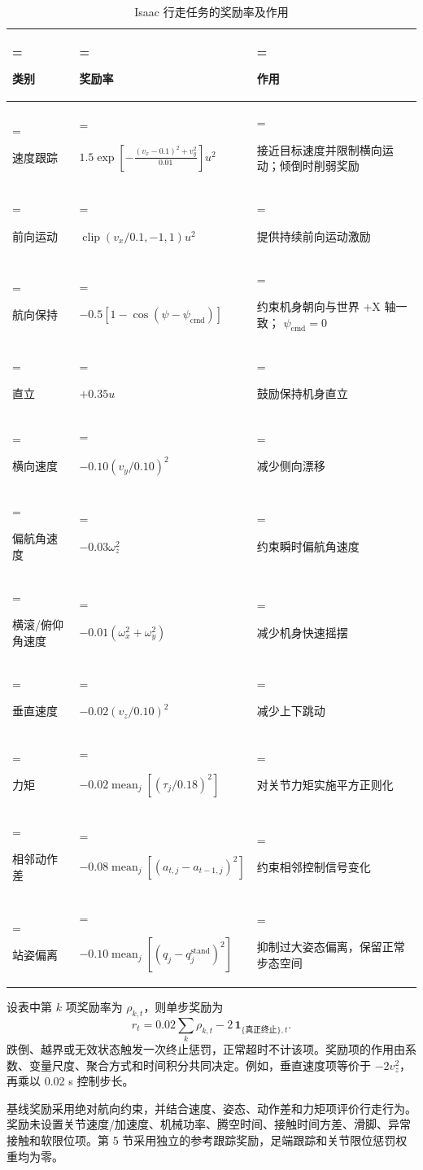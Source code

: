 \documentclass[UTF8,a4paper,zihao=5,fontset=fandol]{ctexart}
\begin{document}
\begin{table}[!htbp]
\centering
\caption{Isaac 行走任务的奖励率及作用}
\label{tab:results-3}
\begingroup
\fontsize{8.4}{11.2}\selectfont
\setlength{\tabcolsep}{3pt}
\renewcommand{\arraystretch}{1.20}
\begin{tabularx}{\linewidth}{@{}>{\hsize=0.420000\hsize\linewidth=\hsize\raggedright\arraybackslash}X>{\hsize=1.470000\hsize\linewidth=\hsize\raggedright\arraybackslash}X>{\hsize=1.110000\hsize\linewidth=\hsize\raggedright\arraybackslash}X@{}}
\toprule
\textbf{类别} & \textbf{奖励率} & \textbf{作用} \\
\midrule
速度跟踪 & \(1.5\exp\!\left[-\frac{(v_x-0.1)^2+v_y^2}{0.01}\right]u^2\) & 接近目标速度并限制横向运动；倾倒时削弱奖励 \\
前向运动 & \(\operatorname{clip}(v_x/0.1,-1,1)u^2\) & 提供持续前向运动激励 \\
航向保持 & \(-0.5[1-\cos(\psi-\psi_{\mathrm{cmd}})]\) & 约束机身朝向与世界 +X 轴一致； \(\psi_{\mathrm{cmd}}=0\) \\
直立 & \(+0.35u\) & 鼓励保持机身直立 \\
横向速度 & \(-0.10(v_y/0.10)^2\) & 减少侧向漂移 \\
偏航角速度 & \(-0.03\omega_z^2\) & 约束瞬时偏航角速度 \\
横滚/俯仰角速度 & \(-0.01(\omega_x^2+\omega_y^2)\) & 减少机身快速摇摆 \\
垂直速度 & \(-0.02(v_z/0.10)^2\) & 减少上下跳动 \\
力矩 & \(-0.02\operatorname{mean}_j[(\tau_j/0.18)^2]\) & 对关节力矩实施平方正则化 \\
相邻动作差 & \(-0.08\operatorname{mean}_j[(a_{t,j}-a_{t-1,j})^2]\) & 约束相邻控制信号变化 \\
站姿偏离 & \(-0.10\operatorname{mean}_j[(q_j-q^{\mathrm{stand}}_j)^2]\) & 抑制过大姿态偏离，保留正常步态空间 \\
\bottomrule
\end{tabularx}
\endgroup
\end{table}
\FloatBarrier

设表中第 \(k\) 项奖励率为 \(\rho_{k,t}\)，则单步奖励为
\begin{equation}
r_t=0.02\sum_k\rho_{k,t}-2\,\mathbf{1}_{\{\text{真正终止}\},t}.
\end{equation}
跌倒、越界或无效状态触发一次终止惩罚，正常超时不计该项。奖励项的作用由系数、变量尺度、聚合方式和时间积分共同决定。例如，垂直速度项等价于 \(-2v_z^2\)，再乘以 0.02 s 控制步长。

基线奖励采用绝对航向约束，并结合速度、姿态、动作差和力矩项评价行走行为。奖励未设置关节速度/加速度、机械功率、腾空时间、接触时间方差、滑脚、异常接触和软限位项。第 5 节采用独立的参考跟踪奖励，足端跟踪和关节限位惩罚权重均为零。
\end{document}
